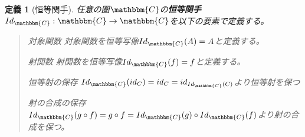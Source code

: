 \documentclass[uplatex,dvipdfmx]{jsarticle}
\newcommand{\cat}[1]{\mathbbm{#1}}
\newcommand{\arrow}{\rightarrow}
\newcommand{\functor}[3]{#1:\cat{#2}\arrow \cat{#3}}
\newtheorem{define}[proof]{定義}
\numberwithin{proof}{subsection}
\newenvironment{mydescription}
{\begin{description}
  \setlength{\parskip}{0.5cm}
}
{\end{description}}
\begin{document}
	\begin{define}[恒等関手]
		任意の圏$\cat{C}$の\textbf{恒等関手}$\functor{Id_{\cat{C}}}{C}{C}$を以下の要素で定義する。
		\begin{quote}
			\begin{mydescription}
				\item[対象関数] 対象関数を恒等写像$Id_{\cat{C}}(A)=A$と定義する。
				\item[射関数] 射関数を恒等写像$Id_{\cat{C}}(f)=f$と定義する。
				\item[恒等射の保存] $Id_{\cat{C}}(id_C)=id_C=id_{Id_{\cat{C}}(C)}$より恒等射を保つ
				\item[射の合成の保存] $Id_{\cat{C}}(g\circ f)=g\circ f=Id_{\cat{C}}(g)\circ Id_{\cat{C}}(f)$より射の合成を保つ。
			\end{mydescription}
		\end{quote}
	\end{define}
\end{document}
